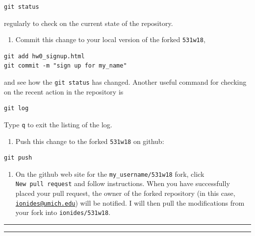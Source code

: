 \documentclass[]{article}
\providecommand{\tightlist}{%
  \setlength{\itemsep}{0pt}\setlength{\parskip}{0pt}}
\begin{document}
\begin{verbatim}
git status
\end{verbatim}

regularly to check on the current state of the repository.

\begin{enumerate}
\def\labelenumi{\arabic{enumi}.}
\setcounter{enumi}{4}
\tightlist
\item
  Commit this change to your local version of the forked
  \texttt{531w18},
\end{enumerate}

\begin{verbatim}
git add hw0_signup.html
git commit -m "sign up for my_name"
\end{verbatim}

and see how the \texttt{git\ status} has changed. Another useful command
for checking on the recent action in the repository is

\begin{verbatim}
git log
\end{verbatim}

Type \texttt{q} to exit the listing of the log.

\begin{enumerate}
\def\labelenumi{\arabic{enumi}.}
\setcounter{enumi}{5}
\tightlist
\item
  Push this change to the forked \texttt{531w18} on github:
\end{enumerate}

\begin{verbatim}
git push
\end{verbatim}

\begin{enumerate}
\def\labelenumi{\arabic{enumi}.}
\setcounter{enumi}{6}
\tightlist
\item
  On the github web site for the \texttt{my\_username/531w18} fork,
  click \texttt{New\ pull\ request} and follow instructions. When you
  have successfully placed your pull request, the owner of the forked
  repository (in this case,
  \href{mailto:ionides@umich.edu}{\nolinkurl{ionides@umich.edu}}) will
  be notified. I will then pull the modifications from your fork into
  \texttt{ionides/531w18}.
\end{enumerate}

\begin{center}\rule{0.5\linewidth}{\linethickness}\end{center}

\begin{center}\rule{0.5\linewidth}{\linethickness}\end{center}
\end{document}
